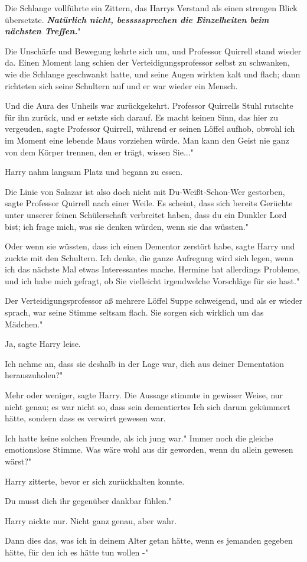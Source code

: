 Die Schlange vollführte ein Zittern, das Harrys Verstand als einen strengen
Blick übersetzte. \glqq{}\textbf{\emph{Natürlich nicht, besssssprechen die
Einzelheiten beim nächsten Treffen.}}"

Die Unschärfe und Bewegung kehrte sich um, und Professor Quirrell stand wieder
da. Einen Moment lang schien der Verteidigungsprofessor selbst zu schwanken, wie
die Schlange geschwankt hatte, und seine Augen wirkten kalt und flach; dann
richteten sich seine Schultern auf und er war wieder ein Mensch.

Und die Aura des Unheils war zurückgekehrt. Professor Quirrells Stuhl rutschte
für ihn zurück, und er setzte sich darauf. \glqq{}Es macht keinen Sinn, das hier
zu vergeuden\grqq{}, sagte Professor Quirrell, während er seinen Löffel aufhob,
\glqq{}obwohl ich im Moment eine lebende Maus vorziehen würde. Man kann den Geist
nie ganz von dem Körper trennen, den er trägt, wissen Sie..."

Harry nahm langsam Platz und begann zu essen.

\glqq{}Die Linie von Salazar ist also doch nicht mit Du-Weißt-Schon-Wer
gestorben\grqq{}, sagte Professor Quirrell nach einer Weile. \glqq{}Es scheint,
dass sich bereits Gerüchte unter unserer feinen Schülerschaft verbreitet haben,
dass du ein Dunkler Lord bist; ich frage mich, was sie denken würden, wenn sie
das wüssten."

\glqq{}Oder wenn sie wüssten, dass ich einen Dementor zerstört habe\grqq{}, sagte
Harry und zuckte mit den Schultern. \glqq{}Ich denke, die ganze Aufregung wird
sich legen, wenn ich das nächste Mal etwas Interessantes mache. Hermine hat
allerdings Probleme, und ich habe mich gefragt, ob Sie vielleicht irgendwelche
Vorschläge für sie hast."

Der Verteidigungsprofessor aß mehrere Löffel Suppe schweigend, und als er wieder
sprach, war seine Stimme seltsam flach. \glqq{}Sie sorgen sich wirklich um das
Mädchen."

\glqq{}Ja\grqq{}, sagte Harry leise.

\glqq{}Ich nehme an, dass sie deshalb in der Lage war, dich aus deiner
Dementation herauszuholen?"

\glqq{}Mehr oder weniger\grqq{}, sagte Harry. Die Aussage stimmte in gewisser
Weise, nur nicht genau; es war nicht so, dass sein dementiertes Ich sich darum
gekümmert hätte, sondern dass es verwirrt gewesen war.

\glqq{}Ich hatte keine solchen Freunde, als ich jung war." Immer noch die gleiche
emotionslose Stimme. \glqq{}Was wäre wohl aus dir geworden, wenn du allein
gewesen wärst?"

Harry zitterte, bevor er sich zurückhalten konnte.

\glqq{}Du musst dich ihr gegenüber dankbar fühlen."

Harry nickte nur. Nicht ganz genau, aber wahr.

\glqq{}Dann dies das, was ich in deinem Alter getan hätte, wenn es jemanden
gegeben hätte, für den ich es hätte tun wollen -"

